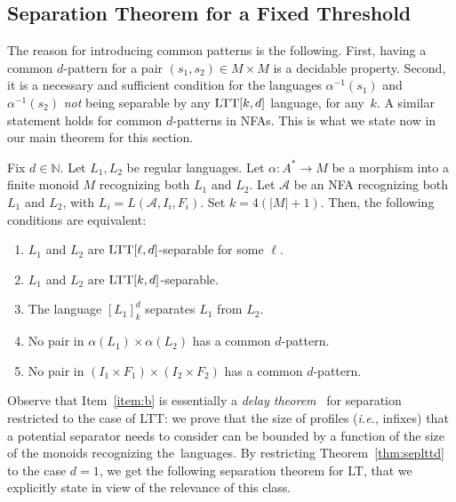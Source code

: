 \documentclass{LMCS}
\newcommand\nat{\ensuremath{\mathbb{N}}\xspace}
\newcommand\As{\ensuremath{\mathcal{A}}\xspace}
\newcommand{\lt}{\textup{LT}\xspace}
\newcommand{\ltt}{\textup{LTT}\xspace}
\newcommand{\lttclos}[3]{\ensuremath{[#1]_{#2}^{#3}}}
\theoremstyle{plain}
\begin{document}
\subsection{Separation Theorem for a Fixed Threshold} The reason for
introducing common patterns is the following. First, having a common
$d$-pattern for a pair $(s_1,s_2)\in M\times M$ is a decidable
property. Second, it is a necessary and sufficient condition for the languages
$\alpha^{-1}(s_1)$ and $\alpha^{-1}(s_2)$ \emph{not} being separable by any
$\ltt[k,d]$ language, for any~$k$. A similar statement holds for common
$d$-patterns in NFAs. This is what we state now in our main theorem for this
section.

\begin{thm}
  \label{thm:seplttd}
  Fix $d \in \nat$. Let $L_1,L_2$ be regular languages. Let
  $\alpha:A^*\to M$ be a morphism into a finite monoid $M$ recognizing both
  $L_1$ and $L_2$. Let $\As$ be an NFA recognizing both $L_1$ and $L_2$, with
  $L_i=L(\As,I_i,F_i)$. Set $k=4(|M|+1)$. Then, the following conditions
  are equivalent:
  \begin{enumerate}
  \item\label{item:a} $L_1$ and $L_2$ are $\ltt[\ell,d]$-separable for some $\ell$.
  \item\label{item:b} $L_1$ and $L_2$ are $\ltt[k,d]$-separable.
  \item\label{item:c} The language $\lttclos{L_1}{k}{d}$ separates $L_1$ from $L_2$.
  \item\label{item:d} No pair in $\alpha(L_1)\times\alpha(L_2)$ has a common $d$-pattern.
  \item\label{item:e} No pair in $(I_1\times F_1) \times(I_2\times F_2)$  has a common $d$-pattern.
  \end{enumerate}
\end{thm}

Observe that Item~\eqref{item:b} is essentially a \emph{delay theorem}~\cite{Straubing:Finite-semigroup-varieties-form:1985:a}
for separation restricted to the case of \ltt: we prove that the size
of profiles (\emph{i.e.}, infixes) that a potential separator needs to
consider can be bounded by a function of the size of the monoids
recognizing the~languages.
By restricting Theorem~\ref{thm:seplttd} to the case
$d=1$, we get the following separation theorem for \lt, that we explicitly
state in view of the relevance of this class.
\end{document}
